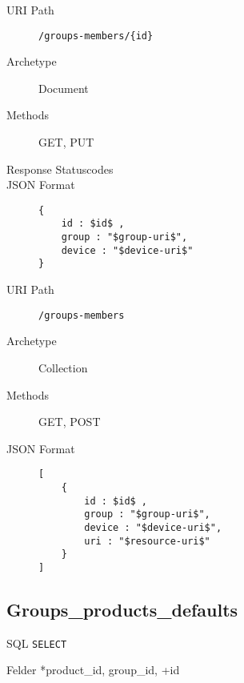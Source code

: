 \documentclass[10pt,a4paper]{scrartcl}
\begin{document}
\begin{mdframed}[style=def]
\begin{description}
	\item[URI Path] \texttt{/groups-members/\{id\}}
	\item[Archetype] Document
	\item[Methods] GET, PUT
	\item[Response Statuscodes] \hfill
	\item[JSON Format] \hfill
\begin{lstlisting}
{
	id : $id$ ,
	group : "$group-uri$",
	device : "$device-uri$"
}
\end{lstlisting}
\end{description}
\end{mdframed}

\begin{mdframed}[style=def]
\begin{description}
	\item[URI Path] \texttt{/groups-members}
	\item[Archetype] Collection
	\item[Methods] GET, POST
	\item[JSON Format] \hfill
\begin{lstlisting}
[
    {
    	id : $id$ ,
    	group : "$group-uri$",
    	device : "$device-uri$",
	    uri : "$resource-uri$"
    }
]
\end{lstlisting}
\end{description}
\end{mdframed}


\pagebreak
\subsection{Groups\_products\_defaults}

\begin{description*}
    \item[SQL] \texttt{SELECT}
    \item[Felder] *product\_id, group\_id, +id
\end{description*}
\end{document}
